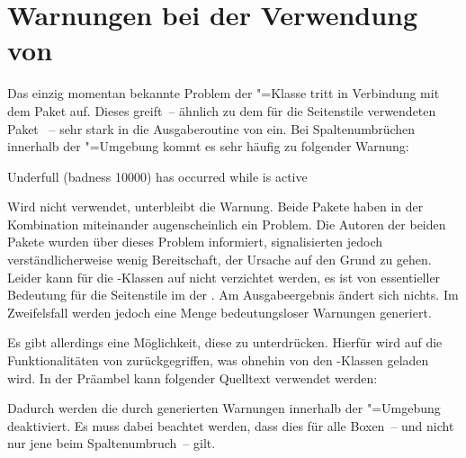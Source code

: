 \section{Warnungen bei der Verwendung von }
Das einzig momentan bekannte Problem der \TUDScript"=Klasse tritt in Verbindung 
mit dem Paket  auf. Dieses greift~-- ähnlich zu dem für 
die Seitenstile verwendeten Paket ~-- sehr stark in 
die Ausgaberoutine von  ein. Bei Spaltenumbrüchen innerhalb der 
"=Umgebung kommt es sehr häufig zu folgender Warnung:
%
\begin{quoting}
\begin{Code}
Underfull \hbox (badness 10000) has occurred while \output is active
\end{Code}
\end{quoting}
%
Wird  nicht verwendet, unterbleibt die Warnung. Beide 
Pakete haben in der Kombination miteinander augenscheinlich ein Problem. Die 
Autoren der beiden Pakete wurden über dieses Problem informiert, signalisierten 
jedoch verständlicherweise wenig Bereitschaft, der Ursache auf den Grund zu 
gehen. Leider kann für die \TUDScript-Klassen auf  
nicht verzichtet werden, es ist von essentieller Bedeutung für die Seitenstile 
im \CD der \TnUD. Am Ausgabeergebnis ändert sich nichts. Im Zweifelsfall werden 
jedoch eine Menge bedeutungsloser Warnungen generiert. 

Es gibt allerdings eine Möglichkeit, diese zu unterdrücken. Hierfür wird auf 
die Funktionalitäten von  zurückgegriffen, was ohnehin von 
den \TUDScript-Klassen geladen wird. In der Präambel kann folgender Quelltext 
verwendet werden:
%
\begin{quoting}
\begin{Code}
\makeatletter
{}
\makeatother
\end{Code}
\end{quoting}
%
Dadurch werden die durch  generierten Warnungen innerhalb der 
"=Umgebung deaktiviert. Es muss dabei beachtet werden, 
dass dies für alle Boxen~-- und nicht nur jene beim Spaltenumbruch~-- gilt.